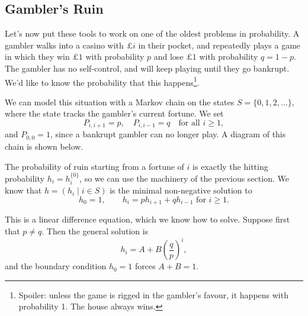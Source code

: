 \subsection{Gambler's Ruin}

Let's now put these tools to work on one of the oldest problems in probability. A gambler walks into a casino with $\pounds i$ in their pocket, and repeatedly plays a game in which they win $\pounds 1$ with probability $p$ and lose $\pounds 1$ with probability $q = 1 - p$. The gambler has no self-control, and will keep playing until they go bankrupt. We'd like to know the probability that this happens\footnote{Spoiler: unless the game is rigged in the gambler's favour, it happens with probability 1. The house always wins.}.

We can model this situation with a Markov chain on the states $S = \{0, 1, 2, \dots\}$, where the state tracks the gambler's current fortune. We set
$$
P_{i, i + 1} = p, \quad P_{i, i - 1} = q \quad \text{for all } i \geq 1,
$$
and $P_{0, 0} = 1$, since a bankrupt gambler can no longer play. A diagram of this chain is shown below.

\begin{center}
	\end{center}

The probability of ruin starting from a fortune of $i$ is exactly the hitting probability $h_i = h_i^{\{0\}}$, so we can use the machinery of the previous section. We know that $h = (h_i \mid i \in S)$ is the minimal non-negative solution to
$$
h_0 = 1, \qquad h_i = p h_{i + 1} + q h_{i - 1} \text{ for } i \geq 1.
$$

This is a linear difference equation, which we know how to solve. Suppose first that $p \neq q$. Then the general solution is
$$
h_i = A + B \left(\frac{q}{p}\right)^i,
$$
and the boundary condition $h_0 = 1$ forces $A + B = 1$.

